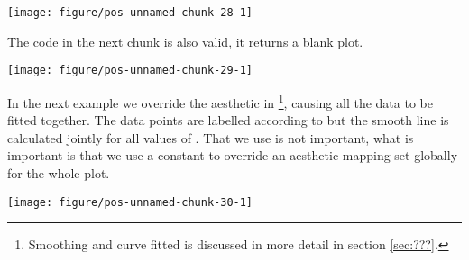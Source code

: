 \documentclass[paper=a4,headsepline,BCOR=12mm,twoside,open=right,%
titlepage,headings=small,fontsize=10pt,index=totoc,bibliography=totoc,%
captions=tableheading,captions=nooneline]{scrbook}\usepackage{knitr}
\begin{document}
\begin{knitrout}\footnotesize
{}\color{fgcolor}\begin{kframe}
\begin{alltt}
\hlstd{()} \hlopt{+}
  \hlstd{(} \hlstd{=}    \hlopt{/} 
       \hlstd{=}  \hlopt{+}
  \hlstd{(} 
\end{alltt}
\end{kframe}

{\centering \texttt{[image: figure/pos-unnamed-chunk-28-1]} 

}



\end{knitrout}

The code in the next chunk is also valid, it returns a blank plot.

\begin{knitrout}\footnotesize
{}\color{fgcolor}\begin{kframe}
\begin{alltt}
\hlstd{()}
\end{alltt}
\end{kframe}

{\centering \texttt{[image: figure/pos-unnamed-chunk-29-1]} 

}



\end{knitrout}

In the next example we override the  aesthetic in \footnote{Smoothing and curve fitted is discussed in more detail in section \ref{sec:???}.}, causing all the data to be fitted together. The data points are labelled according to  but the smooth line is calculated jointly for all values of . That we use  is not important, what is important is that we use a constant to override an aesthetic mapping set globally for the whole plot.

\begin{knitrout}\footnotesize
{}\color{fgcolor}\begin{kframe}
\begin{alltt}
\hlstd{(}  \hlstd{(}  \hlstd{=} \hlopt{+}
  \hlstd{(}\hlstd{=}\hlstd{)} \hlopt{+}
  \hlstd{()}
\end{alltt}
\end{kframe}

{\centering \texttt{[image: figure/pos-unnamed-chunk-30-1]} 

}



\end{knitrout}
\end{document}
